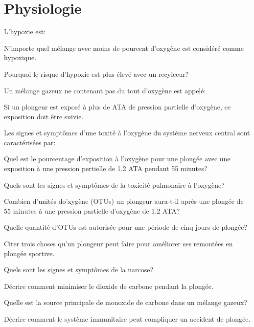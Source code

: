 \documentclass[english,12pt,a4paper]{article}
\begin{document}
	\section{Physiologie}
	\begin{outline}
		\1 L'hypoxie est:

		\1 N'importe quel mélange avec moins de \underline{\hspace{1.5cm}} pourcent d'oxygène est considéré comme hypoxique.

		\1 Pourquoi le risque d'hypoxie est plus élevé avec un recylceur?

		\1 Un mélange gazeux ne contenant pas du tout d'oxygène est appelé:

		\1 Si un plongeur est exposé à plus de \underline{\hspace{1.5cm}} ATA de pression partielle d'oxygène, ce exposition doit être suivie.

		\1 Les signes et symptômes d'une toxité à l'oxygène du système nerveux central sont caractérisées par:

		\1 Quel est le pourcentage d'exposition à l'oxygène pour une plongée avec une exposition à une pression pertielle de 1.2 ATA pendant 55 minutes?

		\1 Quels sont les signes et symptômes de la toxicité pulmonaire à l'oxygène?

		\1 Combien d'unités do'xygène (OTUs) un plongeur aura-t-il après une plongée de 55 minutes à une pression partielle d'oxygène de 1.2 ATA?

		\1 Quelle quantité d'OTUs est autorisée pour une période de cinq jours de plongée?

		\1 Citer trois choses qu'un plongeur peut faire pour améliorer ses remontées en plongée sportive.

		\1 Quels sont les signes et symptômes de la narcose?

		\1 Décrire comment minimiser le dioxide de carbone pendant la plongée.

		\1 Quelle est la source principale de monoxide de carbone dans un mélange gazeux?

		\1 Décrire comment le système immunitaire peut compliquer un accident de plongée.
	\end{outline}
	\pagebreak

\end{document}
